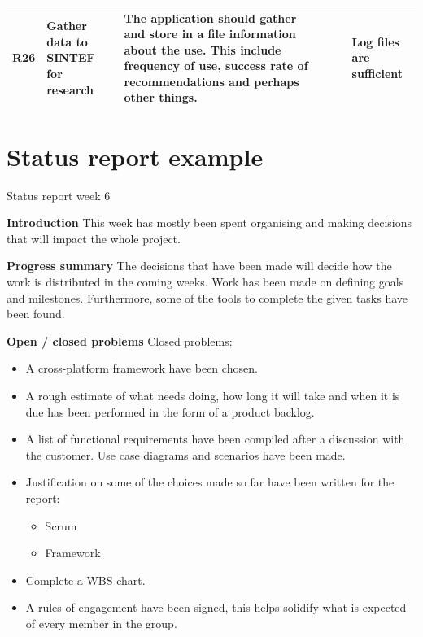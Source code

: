 \begin{appendices}
\begin{center}
\begin{longtable}{ | p{1cm} | p{3cm} | p{5cm} | p{1.5cm} | p{2.5cm} | p{3cm} | }
		R26& Gather data to SINTEF for research & The application should gather and store in a file information about the use. This include frequency of use, success rate of recommendations and perhaps other things.  &  &  & Log files are sufficient\\\hline
		
	\end{longtable}
\end{center}
\pagebreak

\chapter{Status report example}

Status report week 6\newline


		\textbf{Introduction} \newline
		This week has mostly been spent organising and making decisions that will impact the whole project.\newline
		
		\textbf{Progress summary} \newline
		The decisions that have been made will decide how the work is distributed in the coming weeks. Work has been made on defining goals and milestones. Furthermore, some of the tools to complete the given tasks have been found.\newline
		
		\textbf{Open / closed problems}\newline
		Closed problems:
		\begin{itemize}
			\item A cross-platform framework have been chosen.
			\item A rough estimate of what needs doing, how long it will take and when it is due has been performed in the form of a product backlog.
			\item A list of functional requirements have been compiled after a discussion with the customer.
			Use case diagrams and scenarios have been made.
			\item Justification on some of the choices made so far have been written for the report:
			\begin{itemize}
				\item Scrum
				\item Framework
			\end{itemize}
			\item Complete a WBS chart.
			\item A rules of engagement have been signed, this helps solidify what is expected of every member in the group.\newline
		\end{itemize}
		

\end{appendices}
